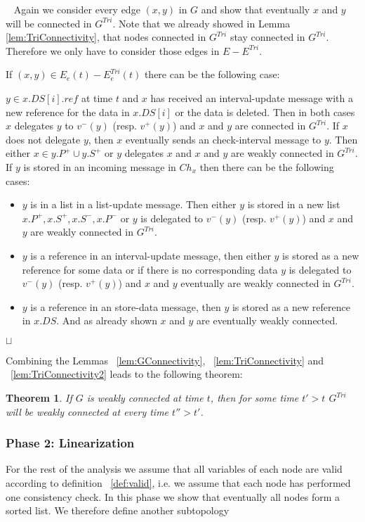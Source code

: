 \documentclass[11pt]{article}
\newtheorem{theorem}{Theorem}[section]
\newcommand{\sq}{\hbox{\rlap{$\sqcap$}$\sqcup$}}
\newcommand{\qed}{\hspace*{\fill}\sq}
\newenvironment{proof}{\noindent {\bf Proof.}\ }{\qed\par\vskip 4mm\par}
\begin{document}
\begin{proof}
Again we consider every edge $(x,y)$ in $G$ and show that eventually $x$ and $y$ will be connected in $G^{Tri}$. Note that we already showed in Lemma \ref{lem:TriConnectivity}, that nodes connected in $G^{Tri}$ stay connected in $G^{Tri}$. Therefore we only have to consider those edges in $E-E^{Tri}$.

If $(x,y)\in E_e(t) - E^{Tri}_e(t)$ there can be the following case:

$y \in x.DS[i].ref$ at time $t$ and $x$ has received an interval-update message with a new reference for the data in $x.DS[i]$ or the data is deleted. Then in both cases $x$ delegates $y$ to $v^{-}(y)$ (resp. $v^{+}(y)$) and $x$ and $y$ are connected in $G^{Tri}$. If $x$ does not delegate $y$, then $x$ eventually sends an check-interval message to $y$. Then either $x \in y.P^+ \cup y.S^+$ or $y$ delegates $x$ and $x$ and $y$ are weakly connected in $G^{Tri}$. If $y$ is stored in an incoming message in $Ch_x$ then there can be the following cases:

\begin{itemize}
  \item $y$ is in a list in a list-update message. Then either $y$ is stored in a new list $x.P^+,x.S^+,x.S^-,x.P^-$ or $y$ is delegated to $v^{-}(y)$ (resp. $v^{+}(y)$) and $x$ and $y$ are weakly connected in $G^{Tri}$.
  \item $y$ is a reference in an interval-update message, then either $y$ is stored as a new reference for some data or if there is no corresponding data $y$ is delegated to $v^{-}(y)$ (resp. $v^{+}(y)$) and $x$ and $y$ eventually are weakly connected in $G^{Tri}$.
  \item $y$ is a reference in an store-data message, then $y$ is stored as a new reference in $x.DS$. And as already shown $x$ and $y$ are eventually weakly connected.
\end{itemize}
\end{proof}


Combining the Lemmas ~\ref{lem:GConnectivity}, ~\ref{lem:TriConnectivity} and ~\ref{lem:TriConnectivity2} leads to the following theorem:
\begin{theorem}\label{theo:phase1}
If $G$ is weakly connected at time $t$, then for some time $t'>t$ $G^{Tri}$ will be weakly connected at every time $t''>t'$.
\end{theorem}

\subsubsection{Phase 2: Linearization}
For the rest of the analysis we assume that all variables of each node are valid according to definition ~\ref{def:valid}, i.e. we assume that each node has performed one consistency check. In this phase we show that eventually all nodes form a sorted list. We therefore define another subtopology
\end{document}
